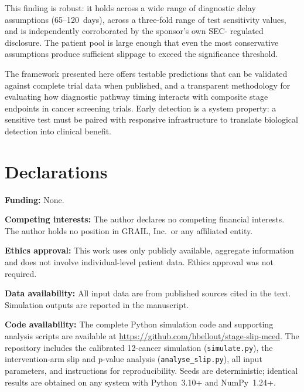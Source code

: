 \documentclass[11pt,letter]{article}
\begin{document}
This finding is robust: it holds across a wide range of diagnostic delay
assumptions (65--120~days), across a three-fold range of test sensitivity
values, and is independently corroborated by the sponsor's own SEC-
regulated disclosure. The patient pool is large enough that even the most
conservative assumptions produce sufficient slippage to exceed the
significance threshold.

The framework presented here offers testable predictions that can be
validated against complete trial data when published, and a transparent
methodology for evaluating how diagnostic pathway timing interacts with
composite stage endpoints in cancer screening trials. Early detection is
a system property: a sensitive test must be paired with responsive
infrastructure to translate biological detection into clinical benefit.


\section*{Declarations}

\textbf{Funding:} None.

\textbf{Competing interests:} The author declares no competing financial
interests. The author holds no position in GRAIL, Inc.\ or any affiliated
entity.

\textbf{Ethics approval:} This work uses only publicly available, aggregate
information and does not involve individual-level patient data. Ethics
approval was not required.

\textbf{Data availability:} All input data are from published sources
cited in the text. Simulation outputs are reported in the manuscript.

\textbf{Code availability:} The complete Python simulation code and
supporting analysis scripts are available at
\url{https://github.com/hbellout/stage-slip-mced}. The repository includes
the calibrated 12-cancer simulation (\texttt{simulate.py}), the
intervention-arm slip and p-value analysis
(\texttt{analyse\_slip.py}), all input parameters, and instructions for
reproducibility. Seeds are deterministic; identical results are obtained
on any system with Python~3.10+ and NumPy~1.24+.
\end{document}
